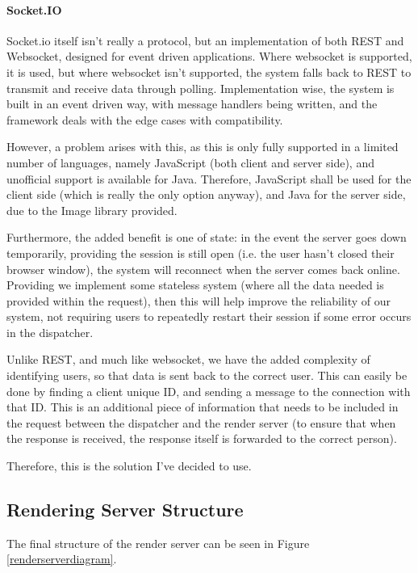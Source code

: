 \documentclass[10pt,a4paper]{article}
\begin{document}
\paragraph{Socket.IO}
Socket.io itself isn't really a protocol, but an implementation of both REST and Websocket, designed for event driven
applications. Where websocket is supported, it is used, but where websocket isn't supported, the system falls back to
REST to transmit and receive data through polling. Implementation wise, the system is built in an event driven way,
with message handlers being written, and the framework deals with the edge cases with compatibility. \cite{SocketIOBook}

However, a problem arises with this, as this is only fully supported in a limited number of languages, namely JavaScript (both client
and server side), and unofficial support is available for Java. Therefore, JavaScript shall be used for the client side (which is really the only
option anyway), and Java for the server side, due to the Image library provided. 

Furthermore, the added benefit is one of state: in the event the server goes down temporarily, providing the session is still open (i.e. the user hasn't
closed their browser window), the system will reconnect when the server comes back online. Providing we implement some stateless system (where all the data
needed is provided within the request), then this will help improve the reliability of our system, not requiring users to repeatedly restart their session
if some error occurs in the dispatcher. 

Unlike REST, and much like websocket, we have the added complexity of identifying users, so that data is sent back to the correct user. This can easily be done
by finding a client unique ID, and sending a message to the connection with that ID. This is an additional piece of information that needs to be included in the request
between the dispatcher and the render server (to ensure that when the response is received, the response itself is forwarded to the correct person).

Therefore, this is the solution I've decided to use.

\subsection{Rendering Server Structure}
The final structure of the render server can be seen in Figure \ref{renderserverdiagram}.
\end{document}
